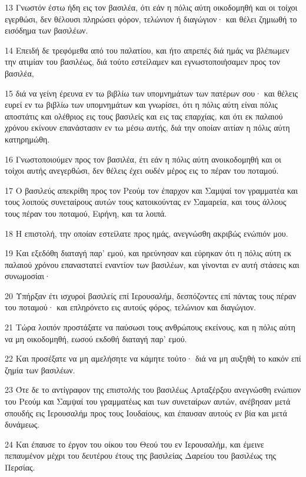 \par 13 Γνωστόν έστω ήδη εις τον βασιλέα, ότι εάν η πόλις αύτη οικοδομηθή και οι τοίχοι εγερθώσι, δεν θέλουσι πληρώσει φόρον, τελώνιον ή διαγώγιον· και θέλει ζημιωθή το εισόδημα των βασιλέων.
\par 14 Επειδή δε τρεφόμεθα από του παλατίου, και ήτο απρεπές διά ημάς να βλέπωμεν την ατιμίαν του βασιλέως, διά τούτο εστείλαμεν και εγνωστοποιήσαμεν προς τον βασιλέα,
\par 15 διά να γείνη έρευνα εν τω βιβλίω των υπομνημάτων των πατέρων σου· και θέλεις ευρεί εν τω βιβλίω των υπομνημάτων και γνωρίσει, ότι η πόλις αύτη είναι πόλις αποστάτις και ολέθριος εις τους βασιλείς και εις τας επαρχίας, και ότι εκ παλαιού χρόνου εκίνουν επανάστασιν εν τω μέσω αυτής, διά την οποίαν αιτίαν η πόλις αύτη κατηρημώθη.
\par 16 Γνωστοποιούμεν προς τον βασιλέα, έτι εάν η πόλις αύτη ανοικοδομηθή και οι τοίχοι αυτής ανεγερθώσι, δεν θέλεις έχει ουδέν μέρος εις το πέραν του ποταμού.
\par 17 Ο βασιλεύς απεκρίθη προς τον Ρεούμ τον έπαρχον και Σαμψαί τον γραμματέα και τους λοιπούς συνεταίρους αυτών τους κατοικούντας εν Σαμαρεία, και τους άλλους τους πέραν του ποταμού, Ειρήνη, και τα λοιπά.
\par 18 Η επιστολή, την οποίαν εστείλατε προς ημάς, ανεγνώσθη ακριβώς ενώπιόν μου.
\par 19 Και εξεδόθη διαταγή παρ' εμού, και ηρεύνησαν και εύρηκαν ότι η πόλις αύτη εκ παλαιού χρόνου επαναστατεί εναντίον των βασιλέων, και γίνονται εν αυτή στάσεις και συνωμοσίαι·
\par 20 Υπήρξαν έτι ισχυροί βασιλείς επί Ιερουσαλήμ, δεσπόζοντες επί πάντας τους πέραν του ποταμού· και επληρόνετο εις αυτούς φόρος, τελώνιον και διαγώγιον.
\par 21 Τώρα λοιπόν προστάξατε να παύσωσι τους ανθρώπους εκείνους, και η πόλις αύτη να μη οικοδομηθή, εωσού εκδοθή διαταγή παρ' εμού.
\par 22 Και προσέξατε να μη αμελήσητε να κάμητε τούτο· διά να μη αυξηθή το κακόν επί ζημία των βασιλέων.
\par 23 Ότε δε το αντίγραφον της επιστολής του βασιλέως Αρταξέρξου ανεγνώσθη ενώπιον του Ρεούμ και Σαμψαί του γραμματέως και των συνεταίρων αυτών, ανέβησαν μετά σπουδής εις Ιερουσαλήμ προς τους Ιουδαίους, και έπαυσαν αυτούς εν βία και μετά δυνάμεως.
\par 24 Και έπαυσε το έργον του οίκου του Θεού του εν Ιερουσαλήμ, και έμεινε πεπαυμένον μέχρι του δευτέρου έτους της βασιλείας Δαρείου του βασιλέως της Περσίας.

